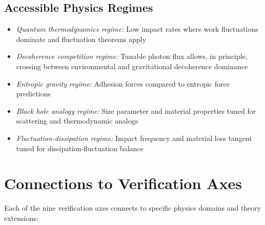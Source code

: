 \documentclass[12pt,twoside]{article}
\begin{document}
\subsection{Accessible Physics Regimes}\label{sec:regimes}
\begin{itemize}
\item \textit{Quantum thermodynamics regime:} Low impact rates where work fluctuations dominate and fluctuation theorems apply
\item \textit{Decoherence competition regime:} Tunable photon flux allows, in principle, crossing between environmental and gravitational decoherence dominance
\item \textit{Entropic gravity regime:} Adhesion forces compared to entropic force predictions
\item \textit{Black hole analogy regime:} Size parameter and material properties tuned for scattering and thermodynamic analogs
\item \textit{Fluctuation-dissipation regime:} Impact frequency and material loss tangent tuned for dissipation-fluctuation balance
\end{itemize}

\section{Connections to Verification Axes}
Each of the nine verification axes connects to specific physics domains and theory extensions:
\end{document}
